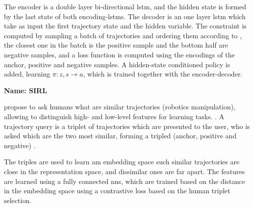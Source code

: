 The encoder is a double layer bi-directional \gls{lstm}, and the hidden state is formed by the last state of both encoding-\glspl{lstm}.
%
The decoder is an one layer \gls{lstm} which take as input the first trajectory state and the hidden variable.
%
The constraint is computed by sampling a batch of trajectories and ordering them according to , the closest one in the batch is the positive sample and the bottom half are negative samples, and a loss function is computed using the encodings of the anchor, positive and negative samples.
%
A hidden-state conditioned  policy is added, learning $\pi:z, s \rightarrow a$, which is trained together with the encoder-decoder.


\textbf{Name: SIRL}

\cite{bobu2023sirl} propose to ask humans what are similar trajectories (robotics manipulation), allowing to distinguish high- and low-level features for learning tasks. .
%
A trajectory query is a triplet of trajectories which are presented to the user, who is asked which are the two most similar, forming a tripled (anchor, positive and negative) .

The triples are used to learn am embedding space such similar trajectories are close in the representation space, and dissimilar ones are far apart.
%
The features are learned using a fully connected \glspl{nn}, which are trained based on the distance in the embedding space using a contrastive loss based on the human triplet selection.
